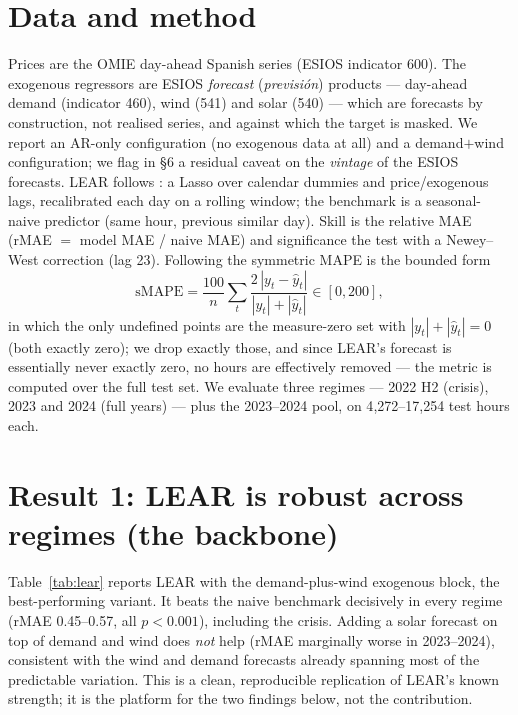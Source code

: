 \documentclass[11pt,a4paper]{article}
\begin{document}
\section{Data and method}

Prices are the OMIE day-ahead Spanish series (ESIOS indicator 600). The exogenous
regressors are ESIOS \emph{forecast} (\textit{previsi\'on}) products --- day-ahead
demand (indicator 460), wind (541) and solar (540) --- which are forecasts by
construction, not realised series, and against which the target is masked. We report
an AR-only configuration (no exogenous data at all) and a demand$+$wind
configuration; we flag in \S6 a residual caveat on the \emph{vintage} of the ESIOS
forecasts. LEAR follows \citet{lago2021}: a Lasso over calendar dummies and
price/exogenous lags, recalibrated each day on a rolling window; the benchmark is a
seasonal-naive predictor (same hour, previous similar day). Skill is the relative
MAE (rMAE $=$ model MAE / naive MAE) and significance the \citet{dieboldmariano1995}
test with a Newey--West correction (lag 23). Following \citet{lago2021} the
symmetric MAPE is the bounded form
\[
\mathrm{sMAPE}=\frac{100}{n}\sum_{t}\frac{2\,|y_t-\hat y_t|}{|y_t|+|\hat y_t|}\in[0,200],
\]
in which the only undefined points are the measure-zero set with
$|y_t|+|\hat y_t|=0$ (both exactly zero); we drop exactly those, and since LEAR's
forecast is essentially never exactly zero, no hours are effectively removed --- the
metric is computed over the full test set. We evaluate three regimes --- 2022 H2
(crisis), 2023 and 2024 (full years) --- plus the 2023--2024 pool, on
4{,}272--17{,}254 test hours each.

\section{Result 1: LEAR is robust across regimes (the backbone)}

Table~\ref{tab:lear} reports LEAR with the demand-plus-wind exogenous block, the
best-performing variant. It beats the naive benchmark decisively in every regime
(rMAE 0.45--0.57, all $p<0.001$), including the crisis. Adding a solar forecast on
top of demand and wind does \emph{not} help (rMAE marginally worse in 2023--2024),
consistent with the wind and demand forecasts already spanning most of the
predictable variation. This is a clean, reproducible replication of LEAR's known
strength; it is the platform for the two findings below, not the contribution.
\end{document}
